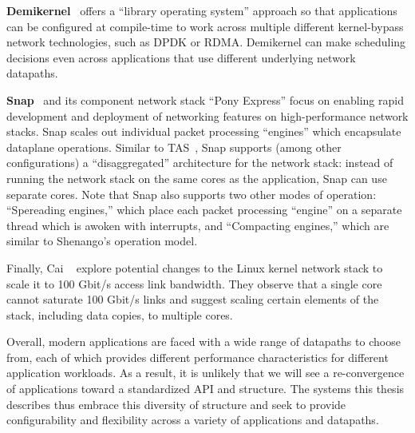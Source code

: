 \textbf{Demikernel}~\cite{demikernel} offers a ``library operating system'' approach so that applications can be configured at compile-time to work across multiple different kernel-bypass network technologies, such as DPDK or RDMA. Demikernel can make scheduling decisions even across applications that use different underlying network datapaths.

\textbf{Snap}~\cite{snap} and its component network stack ``Pony Express'' focus on enabling rapid development and deployment of networking features on high-performance network stacks. 
Snap scales out individual packet processing ``engines'' which encapsulate dataplane operations.
Similar to TAS~\cite{tas}, Snap supports (among other configurations) a ``disaggregated'' architecture for the network stack: instead of running the network stack on the same cores as the application, Snap can use separate cores. Note that Snap also supports two other modes of operation: 
``Spereading engines,'' which place each packet processing ``engine'' on a separate thread which is awoken with interrupts, and  
``Compacting engines,'' which are similar to Shenango's operation model.

Finally, Cai \etal~\cite{host-net-overheads} explore potential changes to the Linux kernel network stack to scale it to 100 Gbit/s access link bandwidth. They observe that a single core cannot saturate 100 Gbit/s links and suggest scaling certain elements of the stack, including data copies, to multiple cores.

Overall, modern applications are faced with a wide range of datapaths to choose from, each of which provides different performance characteristics for different application workloads. As a result, it is unlikely that we will see a re-convergence of applications toward a standardized API and structure. 
The systems this thesis describes thus embrace this diversity of structure and seek to provide configurability and flexibility across a variety of applications and datapaths.
